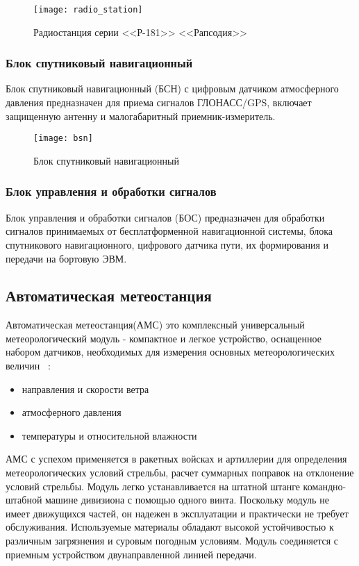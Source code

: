 \begin{figure}[ht]
	\centering
	\texttt{[image: radio\_station]}
	\caption{Радиостанция серии <<Р-181>> <<Рапсодия>>~\cite{prc9661}}
	\label{fig:lit_reiview:meteo:radio_station}
\end{figure}

\subsubsection{Блок спутниковый навигационный}
\label{sub:lit_review:ins:bsn}
Блок спутниковый навигационный (БСН) с цифровым датчиком атмосферного давления предназначен для приема сигналов ГЛОНАСС/GPS, включает защищенную антенну и малогабаритный приемник-измеритель.
\begin{figure}[ht]
	\centering
	\texttt{[image: bsn]}
	\caption{Блок спутниковый навигационный~\cite{bsn}}
	\label{fig:lit_reiview:ins:bsn}
\end{figure}

\subsubsection{Блок управления и обработки сигналов}
\label{sub:lit_review:ins:bos}
Блок управления и обработки сигналов (БОС) предназначен для обработки сигналов принимаемых от бесплатформенной
навигационной системы, блока спутникового навигационного, цифрового датчика пути, их
формирования и передачи на бортовую ЭВМ.

\subsection{Автоматическая метеостанция}
\label{sub:lit_review:meteo}

Автоматическая метеостанция(АМС) это комплексный универсальный метеорологический модуль - компактное и легкое
устройство, оснащенное набором датчиков, необходимых для измерения основных метеорологических величин ~\cite{wxt530}:
\begin{itemize}
	\item направления и скорости ветра
	\item атмосферного давления
	\item температуры и относительной влажности
\end{itemize}

АМС с успехом применяется в ракетных войсках и артиллерии для определения метеорологических условий стрельбы, расчет суммарных поправок на отклонение условий стрельбы.
Модуль легко устанавливается на штатной штанге командно-штабной машине дивизиона с помощью одного винта.
Поскольку модуль не имеет движущихся частей, он надежен в эксплуатации и практически не требует обслуживания.
Используемые материалы обладают высокой устойчивостью к различным загрязнения и суровым погодным условиям.
Модуль соединяется с приемным устройством двунаправленной линией передачи.

